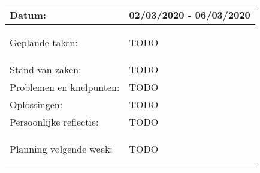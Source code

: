\begin{tabularx}{\textwidth}{| l | X |}
  \hline
  Datum: & 02/03/2020 - 06/03/2020\\
  \hline
  Geplande taken: &
  \begin{compactitem}
    \item TODO
  \end{compactitem}\\
  \hline
  Stand van zaken: & TODO\\
  \hline
  Problemen en knelpunten: & TODO\\
  \hline
  Oplossingen: & TODO\\
  \hline
  Persoonlijke reflectie: & TODO\\
  \hline
  Planning volgende week: & 
  \begin{compactitem}
    \item TODO
  \end{compactitem}\\
  \hline
\end{tabularx}